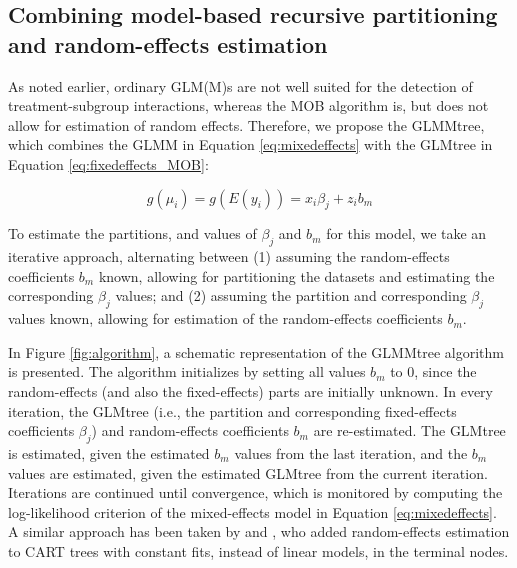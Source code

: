 \documentclass[nobf,doc]{apa}
\begin{document}
\subsection{Combining model-based recursive partitioning and random-effects estimation}

As noted earlier, ordinary GLM(M)s are not well suited for the detection of treatment-subgroup interactions, whereas the MOB algorithm is, but does not allow for estimation of random effects. Therefore, we propose the GLMMtree, which combines the GLMM in Equation \ref{eq:mixedeffects} with the GLMtree in Equation \ref{eq:fixedeffects_MOB}: 

\begin{equation}
\label{eq:glimmertree}
	g(\mu_{i}) = g(E(y_{i})) = x_{i}\beta_{j} + z_{i}b_{m}
\end{equation}

To estimate the partitions, and values of $\beta_j$ and $b_m$ for this model, we take an iterative approach, alternating between (1) assuming the random-effects coefficients $b_m$ known, allowing for partitioning the datasets and estimating the corresponding $\beta_j$ values; and (2) assuming the partition and corresponding $\beta_j$ values known, allowing for estimation of the random-effects coefficients $b_m$. 

In Figure \ref{fig:algorithm}, a schematic representation of the GLMMtree algorithm is presented. The algorithm initializes by setting all values $b_m$ to $0$, since the random-effects (and also the fixed-effects) parts are initially unknown. In every iteration, the GLMtree (i.e., the partition and corresponding fixed-effects coefficients $\beta_j$) and random-effects coefficients $b_m$ are re-estimated. The GLMtree is estimated, given the estimated $b_m$ values from the last iteration, and the $b_m$ values are estimated, given the estimated GLMtree from the current iteration. Iterations are continued until convergence, which is monitored by computing the log-likelihood criterion of the mixed-effects model in Equation \ref{eq:mixedeffects}. A similar approach has been taken by  and , who added random-effects estimation to CART trees with constant fits, instead of linear models, in the terminal nodes. 
\end{document}
